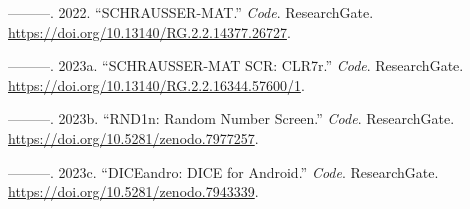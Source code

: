 \documentclass[
]{article}
\newlength{\cslhangindent}
\newlength{\cslentryspacingunit} %
\newenvironment{CSLReferences}[2] %
 {%
  \setlength{\parindent}{0pt}
  \ifodd #1
  \let\oldpar\par
  \def\par{\hangindent=\cslhangindent\oldpar}
  \fi
  \setlength{\parskip}{#2\cslentryspacingunit}
 }%
 {}
\begin{document}
\begin{CSLReferences}{1}{0}
\leavevmode{}%
---------. 2022. {``{SCHRAUSSER-MAT}.''} \emph{Code}. ResearchGate.
\url{https://doi.org/10.13140/RG.2.2.14377.26727}.

\leavevmode{}%
---------. 2023a. {``{SCHRAUSSER-MAT SCR: CLR7r}.''} \emph{Code}.
ResearchGate. \url{https://doi.org/10.13140/RG.2.2.16344.57600/1}.

\leavevmode{}%
---------. 2023b. {``{RND1n: Random Number Screen}.''} \emph{Code}.
ResearchGate. \url{https://doi.org/10.5281/zenodo.7977257}.

\leavevmode{}%
---------. 2023c. {``{DICEandro: DICE for Android}.''} \emph{Code}.
ResearchGate. \url{https://doi.org/10.5281/zenodo.7943339}.

\end{CSLReferences}
\end{document}
